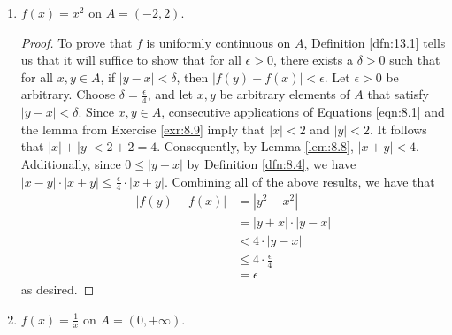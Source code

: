 \documentclass[../main.tex]{subfiles}
\begin{document}
\begin{exercise}
\begin{enumerate}[label={(\alph*)}]
\begin{proof}
            To prove that $f$ is not uniformly continuous on $\R$, Definition \ref{dfn:13.1} tells us that it will suffice to find an $\epsilon>0$ for which no $\delta>0$ exists such that for all $x,y\in\R$, if $|y-x|<\delta$, then $|y^2-x^2|<\epsilon$. Let $\epsilon=2$, and suppose for the sake of contradiction that $\delta>0$ is a number such that for all $x,y\in\R$, if $|y-x|<\delta$, then $|y^2-x^2|<2$. By Theorem \ref{trm:5.2}, there exists a number $y$ such that $0<y<\delta$. Since $-\delta<0<y<\delta$ by Lemma \ref{lem:7.23}, it follows by Definitions \ref{dfn:3.6} and \ref{dfn:3.10} that $y\in(-\delta,\delta)$. Thus, by Exercise \ref{exr:8.9}, $|y-0|=|y|<\delta$. Consequently, $|(y+n)-n|<\delta$. It follows by the above that $|(y+n)^2-n^2|=|y^2+2yn|<2$. If we now let $n=\frac{1}{y}$, then $|y^2+2|<2$. But since $y>0$, we have that $y^2>0$ by Lemma \ref{lem:7.26}. It follows that $y^2+2>2$ by Definition \ref{dfn:7.21}. Therefore, by Definition \ref{dfn:8.4}, we can also show that $|y^2+2|>2$, a contradiction.
        \end{proof}
        \item $f(x)=x^2$ on $A=(-2,2)$.
        \begin{proof}
            To prove that $f$ is uniformly continuous on $A$, Definition \ref{dfn:13.1} tells us that it will suffice to show that for all $\epsilon>0$, there exists a $\delta>0$ such that for all $x,y\in A$, if $|y-x|<\delta$, then $|f(y)-f(x)|<\epsilon$. Let $\epsilon>0$ be arbitrary. Choose $\delta=\frac{\epsilon}{4}$, and let $x,y$ be arbitrary elements of $A$ that satisfy $|y-x|<\delta$. Since $x,y\in A$, consecutive applications of Equations \ref{eqn:8.1} and the lemma from Exercise \ref{exr:8.9} imply that $|x|<2$ and $|y|<2$. It follows that $|x|+|y|<2+2=4$. Consequently, by Lemma \ref{lem:8.8}, $|x+y|<4$. Additionally, since $0\leq|y+x|$ by Definition \ref{dfn:8.4}, we have $|x-y|\cdot|x+y|\leq\frac{\epsilon}{4}\cdot|x+y|$. Combining all of the above results, we have that
            \begin{align*}
                |f(y)-f(x)| &= |y^2-x^2|\\
                &= |y+x|\cdot|y-x|\\
                &< 4\cdot|y-x|\\
                &\leq 4\cdot\frac{\epsilon}{4}\\
                &= \epsilon
            \end{align*}
            as desired.
        \end{proof}
        \item $f(x)=\frac{1}{x}$ on $A=(0,+\infty)$.

\end{enumerate}
\end{exercise}
\end{document}
